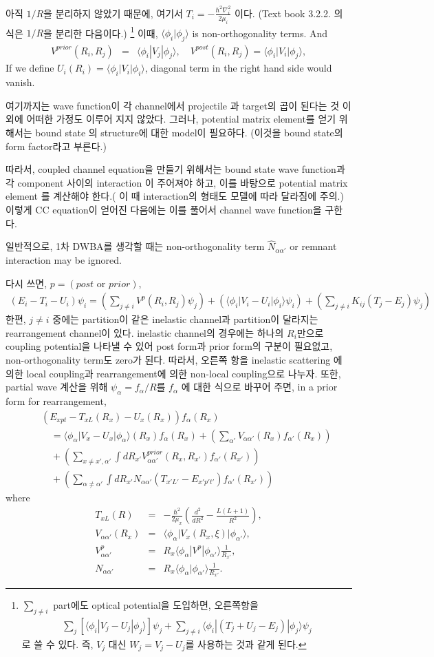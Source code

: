 \documentclass[11pt]{book}
\def\la{\langle}
\def\ra{\rangle}
\newcommand{\bea}{\begin{eqnarray}}
\newcommand{\eea}{\end{eqnarray}}
\newcommand{\no}{\nonumber \\}
\begin{document}
아직 $1/R$을 분리하지 않았기 때문에, 여기서 $T_i=-\frac{\hbar^2\nabla^2_i}{2\mu_i}$
이다. (Text book 3.2.2. 의 식은 $1/R$을 분리한 다음이다.)
\footnote{
$\sum_{j\neq i}$ part에도 optical potential을 도입하면, 오른쪽항을
\bea 
\sum_j [\la \phi_i| V_j-U_j|\phi_j\ra ]\psi_j 
+\sum_{j\neq i} \la \phi_i|(T_j+U_j-E_j)|\phi_j\ra \psi_j
\eea 
로 쓸 수 있다. 즉, $V_j$ 대신 $W_j=V_j-U_j$를 사용하는 것과 같게 된다. 
} 
이때, $\la \phi_i|\phi_j\ra$ is non-orthogonality terms. And
\bea 
V^{prior}(R_i,R_j)&=&\la \phi_i|V_j|\phi_j\ra,\quad 
V^{post}(R_i,R_j)=\la \phi_i|V_i|\phi_j\ra,
\eea 
If we define $U_i(R_i)=\la \phi_i|V_i|\phi_i\ra$, 
diagonal term in the right hand side would vanish. 

여기까지는 wave function이 각 channel에서 projectile 과 target의 곱이 된다는 것 이외에
어떠한 가정도 이루어 지지 않았다. 그러나, potential matrix element를 
얻기 위해서는 bound state 의 structure에 대한 model이 필요하다. (이것을 
bound state의 form factor라고 부른다.)

따라서, coupled channel equation을 만들기 위해서는 bound state wave function과 
각 component 사이의 interaction 이 주어져야 하고, 이를 바탕으로 potential matrix element
를 계산해야 한다.( 이 때 interaction의 형태도 모델에 따라 달라짐에 주의.) 
이렇게 CC equation이 얻어진 다음에는 이를 풀어서 channel wave function을 
구한다. 

일반적으로, 1차 DWBA를 생각할 때는 non-orthogonality term $\hat{N}_{\alpha\alpha'}$ 
or remnant interaction may be ignored.

다시 쓰면, $p=(post\mbox{ or }prior)$, 
\bea 
(E_i-T_i-U_i)\psi_i=\left( \sum_{j\neq i} V^{p}(R_i,R_j)\psi_j\right) 
                   +\left( \la \phi_i| V_i-U_i|\phi_i\ra \psi_i \right) 
                   +\left( \sum_{j\neq i} K_{ij}(T_j-E_j)\psi_j\right)    
\eea 
한편, $j\neq i$ 중에는 partition이 같은 inelastic channel과 partition이 달라지는 
rearrangement channel이 있다. inelastic channel의 경우에는 하나의 $R_i$만으로 
coupling potential을 나타낼 수 있어 post form과 prior form의 구분이 필요없고,
non-orthogonality term도 zero가 된다. 따라서,
오른쪽 항을 inelastic scattering 에 의한 local coupling과 
rearrangement에 의한 non-local coupling으로 나누자. 
또한, partial wave 계산을 위해 $\psi_\alpha=f_\alpha/R$를 $f_\alpha$ 에 대한 
식으로 바꾸어 주면, in a prior form for rearrangement, 
\bea 
& &(E_{xpt}-T_{xL}(R_x)-U_x(R_x))f_\alpha(R_x) \no 
& &\quad =\la \phi_\alpha| V_x-U_x|\phi_\alpha\ra(R_x) f_\alpha(R_x) 
+\left( \sum_{\alpha'} V_{\alpha \alpha'}(R_x)f_{\alpha'}(R_x)\right) 
\no 
& &\quad  +\left(\sum_{x\neq x',\alpha' }\int dR_{x'}  V^{prior}_{\alpha\alpha'}(R_x,R_{x'})
               f_{\alpha'}(R_{x'})\right) 
\no & &\quad               
          +\left( \sum_{\alpha\neq \alpha'}\int dR_{x'} N_{\alpha\alpha'}(T_{x'L'}-E_{x'p't'})f_{\alpha'}(R_{x'})\right)    
\eea 
where
\bea 
T_{xL}(R)&=&-\frac{\hbar^2}{2\mu_x}\left( \frac{d^2}{dR^2}-\frac{L(L+1)}{R^2}\right),\no 
V_{\alpha\alpha'}(R_x)&=&\la \phi_\alpha|V_x(R_x,\xi)|\phi_{\alpha'}\ra ,\no 
V^{p}_{\alpha\alpha'}&=& R_{x}
                     \la \phi_\alpha|V^p|\phi_{\alpha'}\ra\frac{1}{R_{x'}},\no 
N_{\alpha\alpha'}&=& R_x\la \phi_\alpha|\phi_{\alpha'}\ra \frac{1}{R_{x'}}.                     
\eea 
\end{document}
